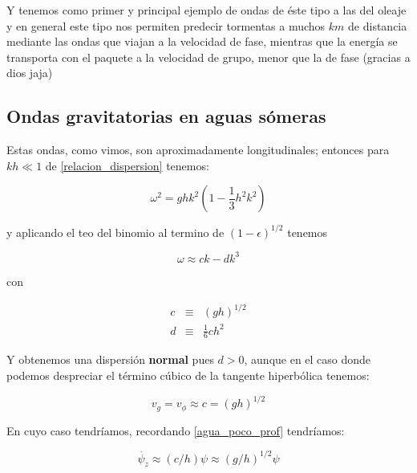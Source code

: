 \documentclass[a4paper,spanish]{article}
\numberwithin{equation}{section}
\begin{document}
Y tenemos como primer y principal ejemplo de ondas de \'este tipo a las del oleaje y en general este tipo nos permiten predecir tormentas a muchos $km$ de distancia mediante las ondas que viajan a la velocidad de fase, mientras que la energ\'ia se transporta con el paquete a la velocidad de grupo, menor que la de fase (gracias a dios jaja)

\subsection{Ondas gravitatorias en aguas s\'omeras}
Estas ondas, como vimos, son aproximadamente longitudinales; entonces para $kh \ll 1$ de \ref{relacion_dispersion} tenemos:

\[\omega^2=ghk^2 \left(1-\frac{1}{3}h^2 k^2\right) \]

y aplicando el teo del binomio al termino de $(1-\epsilon)^{1 / 2}$  tenemos

\[\omega  \approx ck -dk^3\]

con

\begin{equation}
\begin{array}{rcl}
c & \equiv & (gh)^{1/2} \\
d & \equiv & \frac{1}{6}ch^2
\end{array}
\end{equation}

Y obtenemos una dispersi\'on \textbf{normal} pues $d>0$, aunque en el caso donde podemos despreciar el t\'ermino c\'ubico de la tangente hiperb\'olica tenemos:

\begin{equation}
v_g=v_{\phi}\approx c = (gh)^{1 / 2}
\end{equation}

En cuyo caso  tendr\'iamos, recordando \ref{agua_poco_prof} tendr\'iamos:

\begin{equation}
\dot{\psi_z}\approx (c / h) \psi \approx (g / h)^{1 / 2} \psi
\end{equation}
\end{document}
